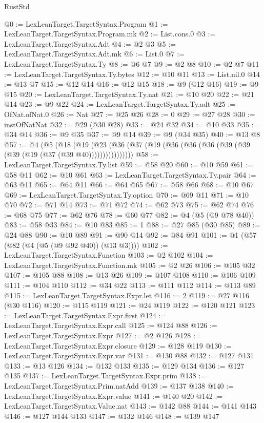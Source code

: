 \begin{lexlean}{RustStd}
\begin{coremodule}
@0 := LexLeanTarget.TargetSyntax.Program
@1 := LexLeanTarget.TargetSyntax.Program.mk
@2 := List.cons.{0}
@3 := LexLeanTarget.TargetSyntax.Adt
@4 := @2 @3
@5 := LexLeanTarget.TargetSyntax.Adt.mk
@6 := List.{0}
@7 := LexLeanTarget.TargetSyntax.Ty
@8 := @6 @7
@9 := @2 @8
@10 := @2 @7
@11 := LexLeanTarget.TargetSyntax.Ty.bytes
@12 := @10 @11
@13 := List.nil.{0}
@14 := @13 @7
@15 := @12 @14
@16 := @12 @15
@18 := @9 (@12 @16)
@19 := @9 @15
@20 := LexLeanTarget.TargetSyntax.Ty.nat
@21 := @10 @20
@22 := @21 @14
@23 := @9 @22
@24 := LexLeanTarget.TargetSyntax.Ty.adt
@25 := OfNat.ofNat.{0}
@26 := Nat
@27 := @25 @26
@28 := 0
@29 := @27 @28
@30 := instOfNatNat
@32 := @29 (@30 @28)
@33 := @24 @32
@34 := @10 @33
@35 := @34 @14
@36 := @9 @35
@37 := @9 @14
@39 := @9 (@34 @35)
@40 := @13 @8
@57 := @4
    (@5
      (@18 (@19 (@23 (@36 (@37 (@19 (@36 (@36 (@36 (@39 (@39 (@39 (@19 (@37 (@39 @40))))))))))))))))
@58 := LexLeanTarget.TargetSyntax.Ty.list
@59 := @58 @20
@60 := @10 @59
@61 := @58 @11
@62 := @10 @61
@63 := LexLeanTarget.TargetSyntax.Ty.pair
@64 := @63 @11
@65 := @64 @11
@66 := @64 @65
@67 := @58 @66
@68 := @10 @67
@69 := LexLeanTarget.TargetSyntax.Ty.option
@70 := @69 @11
@71 := @10 @70
@72 := @71 @14
@73 := @71 @72
@74 := @62 @73
@75 := @62 @74
@76 := @68 @75
@77 := @62 @76
@78 := @60 @77
@82 := @4 (@5 (@9 @78 @40))
@83 := @58 @33
@84 := @10 @83
@85 := 1
@88 := @27 @85 (@30 @85)
@89 := @24 @88
@90 := @10 @89
@91 := @90 @14
@92 := @84 @91
@101 := @1 (@57 (@82 (@4 (@5 (@9 @92 @40)) (@13 @3))))
@102 := LexLeanTarget.TargetSyntax.Function
@103 := @2 @102
@104 := LexLeanTarget.TargetSyntax.Function.mk
@105 := @2 @26
@106 := @105 @32
@107 := @105 @88
@108 := @13 @26
@109 := @107 @108
@110 := @106 @109
@111 := @104 @110
@112 := @34 @22
@113 := @111 @112
@114 := @113 @89
@115 := LexLeanTarget.TargetSyntax.Expr.let
@116 := 2
@119 := @27 @116 (@30 @116)
@120 := @115 @119
@121 := @24 @119
@122 := @120 @121
@123 := LexLeanTarget.TargetSyntax.Expr.first
@124 := LexLeanTarget.TargetSyntax.Expr.call
@125 := @124 @88
@126 := LexLeanTarget.TargetSyntax.Expr
@127 := @2 @126
@128 := LexLeanTarget.TargetSyntax.Expr.closure
@129 := @128 @119
@130 := LexLeanTarget.TargetSyntax.Expr.var
@131 := @130 @88
@132 := @127 @131
@133 := @13 @126
@134 := @132 @133
@135 := @129 @134
@136 := @127 @135
@137 := LexLeanTarget.TargetSyntax.Expr.prim
@138 := LexLeanTarget.TargetSyntax.Prim.natAdd
@139 := @137 @138
@140 := LexLeanTarget.TargetSyntax.Expr.value
@141 := @140 @20
@142 := LexLeanTarget.TargetSyntax.Value.nat
@143 := @142 @88
@144 := @141 @143
@146 := @127 @144 @133
@147 := @132 @146
@148 := @139 @147

\end{coremodule}
\end{lexlean}
